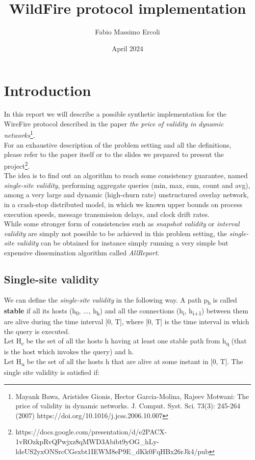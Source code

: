 \documentclass{article}
\title{\textbf{WildFire protocol implementation}}
\author{Fabio Massimo Ercoli}
\date{April 2024}
\begin{document}
\maketitle
\thispagestyle{empty}

\section{Introduction}

In this report we will describe a possible synthetic implementation for the WireFire protocol described in the paper \emph{the price of validity in dynamic networks}\footnote{Mayank Bawa, Aristides Gionis, Hector Garcia-Molina, Rajeev Motwani:
The price of validity in dynamic networks. J. Comput. Syst. Sci. 73(3): 245-264 (2007)
https://doi.org/10.1016/j.jcss.2006.10.007
}.\\
For an exhaustive description of the problem setting and all the definitions, please refer to the paper itself or to the slides we prepared to present the project\footnote{https://docs.google.com/presentation/d/e2PACX-1vROzkpRvQPwjxz8qMWD3Abibt9yOG\_hLy-ldeUS2yxONSrcCGexbt1IEWM8eP9E\_dKk0FqHBx26rJk4/pub}.\\
The idea is to find out an algorithm to reach some consistency guarantee, named \emph{single-site validity}, performing aggregate queries (min, max, sum, count and avg), among a very large and dynamic (high-churn rate) unstructured overlay network, in a crash-stop distributed model, in which we known upper bounds on process execution speeds, message transmission delays, and clock drift rates. \\
While some stronger form of consistencies such as \emph{snapshot validity} or \emph{interval validity} are simply not possible to be achieved in this problem setting, the \emph{single-site validity} can be obtained for instance simply running a very simple but expensive dissemination algorithm called \emph{AllReport}.

\subsection{Single-site validity}

We can define the \emph{single-site validity} in the following way.
A path p\textsubscript{h} is called \textbf{stable} if all its hosts (h\textsubscript{0}, ..., h\textsubscript{k}) and all the connections (h\textsubscript{i}, h\textsubscript{i+1}) between them are alive during the time interval [0, T], where [0, T] is the time interval in which the query is executed.\\
Let H\textsubscript{c} be the set of all the hosts h having at least one stable path from h\textsubscript{q} (that is the host which invokes the query) and h. \\
Let H\textsubscript{u} be the set of all the hosts h that are alive at some instant in [0, T].
The single site validity is satisfied if:
\end{document}
